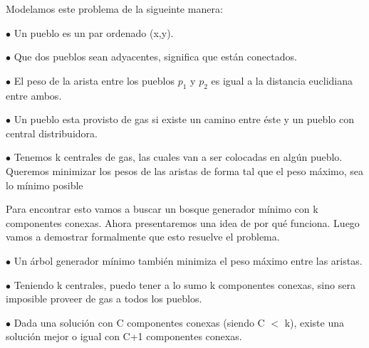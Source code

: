 Modelamos este problema de la sigueinte manera:

$\bullet$ Un pueblo es un par ordenado (x,y).

$\bullet$ Que dos pueblos sean adyacentes, significa que están conectados.

$\bullet$ El peso de la arista entre los pueblos $p_1$ y $p_2$ es igual a la distancia euclidiana entre ambos.

$\bullet$ Un pueblo esta provisto de gas si existe un camino entre éste y un pueblo con central distribuidora.

$\bullet$ Tenemos k centrales de gas, las cuales van a ser colocadas en algún pueblo. Queremos minimizar los pesos de las aristas de forma tal que el peso máximo, sea lo mínimo posible %

Para encontrar esto vamos a buscar un bosque generador mínimo con k componentes conexas. Ahora presentaremos una idea de por qué funciona. Luego vamos a demostrar formalmente que esto resuelve el problema.

$\bullet$ Un árbol generador mínimo también minimiza el peso máximo entre las aristas.

$\bullet$ Teniendo k centrales, puedo tener a lo sumo k componentes conexas, sino sera imposible proveer de gas a todos los pueblos.

$\bullet$ Dada una solución con C componentes conexas (siendo C $<$ k), existe una solución mejor o igual con C+1 componentes conexas.

